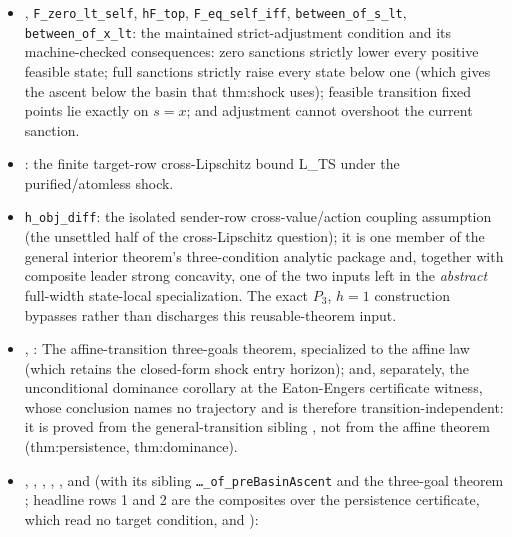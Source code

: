 \begin{itemize}[leftmargin=1.4em,itemsep=1pt]
\item {}, \texttt{F\_zero\_lt\_self}, \texttt{hF\_top}, \texttt{F\_eq\_self\_iff}, \texttt{between\_of\_s\_lt}, \texttt{between\_of\_x\_lt}: the maintained strict-adjustment condition and its machine-checked consequences: zero sanctions strictly lower every positive feasible state; full sanctions strictly raise every state below one (which gives the ascent below the basin that thm:shock uses); feasible transition fixed points lie exactly on $s=x$; and adjustment cannot overshoot the current sanction.
\item {}: the finite target-row cross-Lipschitz bound L\_TS under the purified/atomless shock.
\item \texttt{h\_obj\_diff}: the isolated sender-row cross-value/action coupling assumption (the unsettled half of the cross-Lipschitz question); it is one member of the general interior theorem's three-condition analytic package and, together with composite leader strong concavity, one of the two inputs left in the \emph{abstract} full-width state-local specialization. The exact $P_3$, $h=1$ construction bypasses rather than discharges this reusable-theorem input.
\item {}, : The affine-transition three-goals theorem, specialized to the affine law (which retains the closed-form shock entry horizon); and, separately, the unconditional dominance corollary at the Eaton-Engers certificate witness, whose conclusion names no trajectory and is therefore transition-independent: it is proved from the general-transition sibling , not from the affine theorem (thm:persistence, thm:dominance).
\item {}, ,
,
,
,
and  (with its
sibling \texttt{\ldots\_of\_preBasinAscent} and the three-goal theorem
;
headline rows 1 and 2 are the composites over
the persistence certificate, which read no target condition,
 and
):

\end{itemize}
